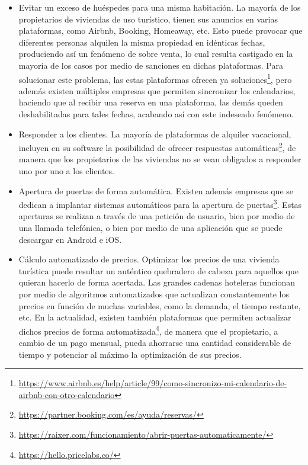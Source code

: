 \begin{itemize}
\item Evitar un exceso de huéspedes para una misma habitación. La mayoría de los propietarios de viviendas de uso turístico, tienen sus anuncios en varias plataformas, como Airbnb, Booking, Homeaway, etc. Esto puede provocar que diferentes personas alquilen la misma propiedad en idénticas fechas, produciendo así un fenómeno de sobre venta, lo cual resulta castigado en la mayoría de los casos por medio de sanciones en dichas plataformas. Para solucionar este problema, las estas plataformas ofrecen ya soluciones\footnote{\url{https://www.airbnb.es/help/article/99/como-sincronizo-mi-calendario-de-airbnb-con-otro-calendario}}, pero además existen múltiples empresas que permiten sincronizar los calendarios, haciendo que al recibir una reserva en una plataforma, las demás queden deshabilitadas para tales fechas, acabando así con este indeseado fenómeno.
\item Responder a los clientes. La mayoría de plataformas de alquiler vacacional, incluyen en su software la posibilidad de ofrecer respuestas automáticas\footnote{\url{https://partner.booking.com/es/ayuda/reservas/}}, de manera que los propietarios de las viviendas no se vean obligados a responder uno por uno a los clientes.
\item Apertura de puertas de forma automática. Existen además empresas que se dedican a implantar sistemas automáticos para la apertura de puertas\footnote{\url{https://raixer.com/funcionamiento/abrir-puertas-automaticamente/}}. Estas aperturas se realizan a través de una petición de usuario, bien por medio de una llamada telefónica, o bien por medio de una aplicación que se puede descargar en Android e iOS.
\item Cálculo automatizado de precios. Optimizar los precios de una vivienda turística puede resultar un auténtico quebradero de cabeza para aquellos que quieran hacerlo de forma acertada. Las grandes cadenas hoteleras funcionan por medio de algoritmos automatizados que actualizan constantemente los precios en función de muchas variables, como la demanda, el tiempo restante, etc. En la actualidad, existen también plataformas que permiten actualizar dichos precios de forma automatizada\footnote{\url{https://hello.pricelabs.co/}}, de manera que el propietario, a cambio de un pago mensual, pueda ahorrarse una cantidad considerable de tiempo y potenciar al máximo la optimización de sus precios.

\end{itemize}

